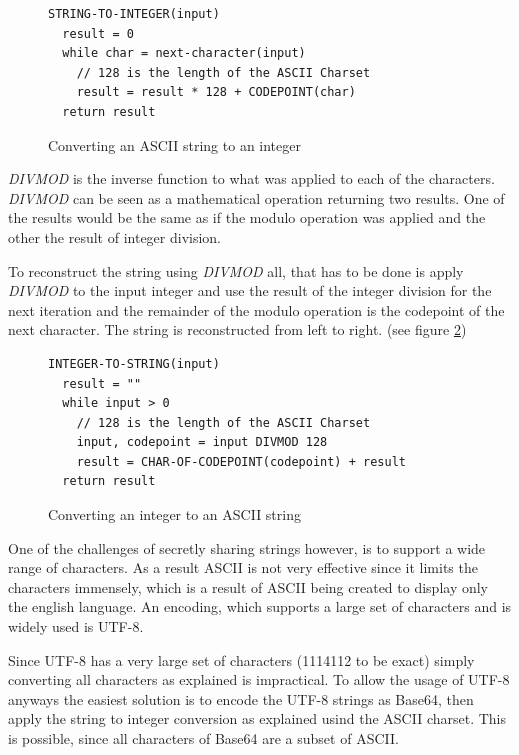 \begin{figure}
\begin{lstlisting}
STRING-TO-INTEGER(input)
  result = 0
  while char = next-character(input)
    // 128 is the length of the ASCII Charset
    result = result * 128 + CODEPOINT(char)
  return result
\end{lstlisting}
\caption{Converting an ASCII string to an integer}
\label{code:stringToInteger}
\end{figure}

\textit{DIVMOD} is the inverse function to what was applied to each of the
characters. \textit{DIVMOD} can be seen as a mathematical operation returning
two results. One of the results would be the same as if the modulo operation
was applied and the other the result of integer division.

To reconstruct the string using \textit{DIVMOD} all, that has to be done is
apply \textit{DIVMOD} to the input integer and use the result of the integer
division for the next iteration and the remainder of the modulo operation is
the codepoint of the next character. The string is reconstructed from left to
right. (see figure \ref{code:integerToString})

\begin{figure}
\begin{lstlisting}
INTEGER-TO-STRING(input)
  result = ""
  while input > 0
    // 128 is the length of the ASCII Charset
    input, codepoint = input DIVMOD 128
    result = CHAR-OF-CODEPOINT(codepoint) + result
  return result
\end{lstlisting}
\caption{Converting an integer to an ASCII string}
\label{code:integerToString}
\end{figure}

One of the challenges of secretly sharing strings however, is to support a wide
range of characters. As a result ASCII is not very effective since it limits
the characters immensely, which is a result of ASCII being created to display
only the english language. An encoding, which supports a large set of
characters and is widely used is UTF-8.

Since UTF-8 has a very large set of characters (1114112 to be exact) simply
converting all characters as explained is impractical. To allow the usage of
UTF-8 anyways the easiest solution is to encode the UTF-8 strings as Base64,
then apply the string to integer conversion as explained usind the ASCII
charset. This is possible, since all characters of Base64 are a subset of
ASCII.

